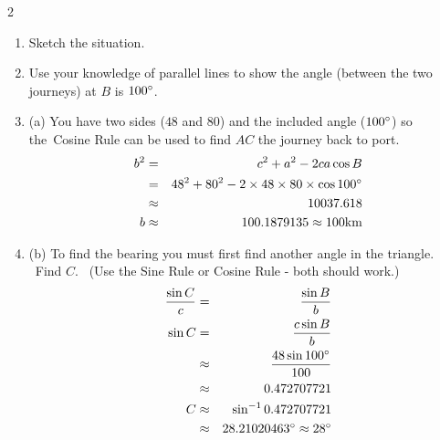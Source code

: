 \columnsep =30pt
\begin {multicols}{2}
    
\setlength\fboxrule{0in}\setlength\fboxsep{0.2in}



\begin{enumerate}
\item Sketch the situation. 

\item Use your knowledge of parallel
lines to show the angle (between the two journeys) at $B$ is $100 \mbox{{\ensuremath{{}^\circ}}}$. 

\item (a) You have two sides ($48$ and $80$) and the included angle ($100 \mbox{{\ensuremath{{}^\circ}}}$) so the\ Cosine Rule can be used to find $A C$ the journey back to port.
\begin{align*}b^{2} &  = & c^{2} +a^{2} -2 c a \cos  B \\
 &  = & 48^{2} +80^{2} -2 \times 48 \times 80 \times \cos  100 \mbox{{\ensuremath{{}^\circ}}} \\
 &  \approx  & 10037.618 \\
b &  \approx  & 100.1879135 \approx 100 \mbox{km}\end{align*}

\item (b) To find the bearing you must first find another angle
in the triangle. \ Find $C$. \ (Use the Sine Rule or Cosine Rule - both should work.)
\begin{align*}\frac{\sin  C}{c} &  = & \frac{\sin  B}{b} \\
\sin  C &  = & \frac{c \sin  B}{b} \\
 &  \approx  & \frac{48 \sin  100 \mbox{{\ensuremath{{}^\circ}}}}{100} \\
 &  \approx  & 0.472707721 \\
C &  \approx  & \sin ^{ -1} 0.472707721 \\
 &  \approx  & 28.21020463 \mbox{{\ensuremath{{}^\circ}}} \approx 28 \mbox{{\ensuremath{{}^\circ}}}\end{align*}\end{enumerate}



\end {multicols}


